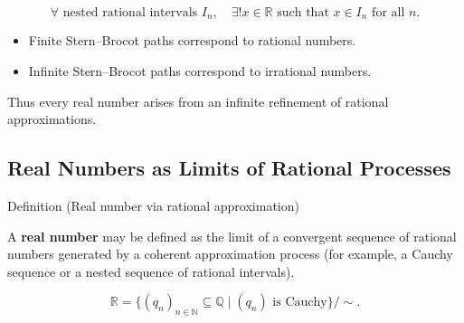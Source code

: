 \begin{remark*}

\[
\forall
\text{ nested rational intervals } I_n,
\quad
\exists! x\in\mathbb{R}
\text{ such that }
x\in I_n
\text{ for all } n.
\]

\end{remark*}

\begin{remark*}[Interpretation]

\begin{itemize}
\item Finite Stern--Brocot paths correspond to rational numbers.
\item Infinite Stern--Brocot paths correspond to irrational numbers.
\end{itemize}

Thus every real number arises from an infinite refinement of
rational approximations.

\end{remark*}

\begin{exposition}
\bigskip
\end{exposition}

\subsection*{Real Numbers as Limits of Rational Processes}

\begin{definitionbox}{Definition (Real number via rational approximation)}
\begin{definition}\label{def:real-limit-approx}

A \textbf{real number} may be defined as the limit of a convergent
sequence of rational numbers generated by a coherent approximation
process (for example, a Cauchy sequence or a nested sequence of
rational intervals).

\end{definition}
\end{definitionbox}

\begin{remark*}

\[
\mathbb{R}
=
\{ (q_n)_{n\in\mathbb{N}} \subseteq \mathbb{Q}
\mid (q_n) \text{ is Cauchy} \} / \sim .
\]

\end{remark*}

